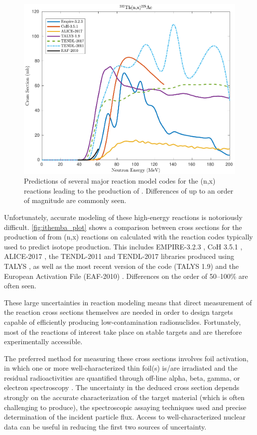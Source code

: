 \documentclass[letterpaper]{ar-1col}
\begin{document}
\begin{figure}
 \centering
 \includegraphics[width=0.7\linewidth]{225Ac.pdf}

 \caption{Predictions of several major reaction model codes for the (n,x) reactions leading to the production of .  Differences of up to an order of magnitude are commonly seen.    }
 \label{fig:ithemba_plot}
\end{figure}

Unfortunately, accurate modeling of these high-energy reactions is notoriously difficult.  \autoref{fig:ithemba_plot} shows a comparison between cross sections for the production of  from (n,x) reactions on  calculated with the reaction codes typically used to predict isotope production.  This includes EMPIRE-3.2.3 \cite{Herman2013}, CoH 3.5.1 \cite{KAWANO2010}, ALICE-2017 \cite{Blann1996}, the TENDL-2011 and TENDL-2017 libraries produced using TALYS \cite{Rochman2017}, as well as the most recent version of the code (TALYS 1.9) \cite{Koning2012} and the European Activation File (EAF-2010) \cite{Forrest2005}.  Differences on the order of 50--100\% are often seen.  

These large uncertainties in reaction modeling means that direct measurement of the reaction cross sections themselves are needed in order to design targets capable of efficiently producing low-contamination radionuclides.  Fortunately, most of the reactions of interest take place on stable targets and are therefore experimentally accessible. 

The preferred method for measuring these cross sections involves foil activation, in which one or more well-characterized thin foil(s) is/are irradiated and the residual radioactivities are quantified through off-line alpha, beta, gamma, or electron spectroscopy \cite{Voyles2018a,Graves2016}.  The uncertainty in the deduced cross section depends strongly on the accurate characterization of the target material (which is often challenging to produce), the spectroscopic assaying techniques used and precise determination of the incident particle flux. Access to well-characterized nuclear data can be useful in reducing the first two sources of uncertainty. 
\end{document}
